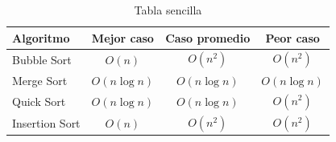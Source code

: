 \begin{table}[H]
\centering
\begin{tabular}{l|ccc}
\toprule
\textbf{Algoritmo} & \textbf{Mejor caso} & \textbf{Caso promedio} & \textbf{Peor caso} \\
\midrule
Bubble Sort   & $O(n)$        & $O(n^2)$      & $O(n^2)$      \\
Merge Sort    & $O(n \log n)$ & $O(n \log n)$ & $O(n \log n)$ \\
Quick Sort    & $O(n \log n)$ & $O(n \log n)$ & $O(n^2)$      \\
Insertion Sort& $O(n)$        & $O(n^2)$      & $O(n^2)$      \\
\bottomrule
\end{tabular}
\caption{Tabla sencilla}
\label{tab:algoritmos}
\end{table}

